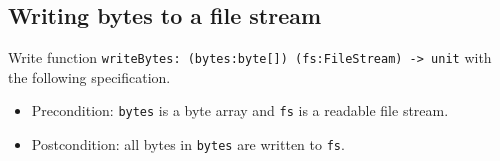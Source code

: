 \subsection*{Writing bytes to a file stream}

Write function \texttt{writeBytes: (bytes:byte[]) (fs:FileStream) -> unit} with the following specification.  
\begin{itemize}
\item Precondition: \texttt{bytes} is a byte array and \texttt{fs} is a readable file stream.
\item Postcondition: all bytes in \texttt{bytes} are written to \texttt{fs}.
\end{itemize}
